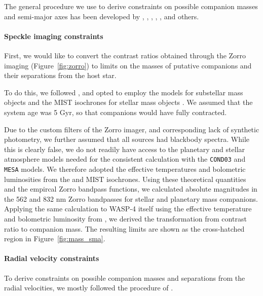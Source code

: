\documentclass[12pt,twocolumn,tighten]{aastex62}
\begin{document}
The general procedure we use to derive constraints on possible
companion masses and semi-major axes has been developed by
\citet{wright_linear_trends_2007}, \citet{crepp_trends_2012},
\citet{montet_trends_2014}, \citet{knutson_friends_2014},
\citet{bryan_statistics_2016,bryan_excess_2019}, and others.

\paragraph{Speckle imaging constraints}

First, we would like to convert the contrast ratios obtained through
the Zorro imaging (Figure~\ref{fig:zorro}) to limits on the masses of
putative companions and their separations from the host star.

To do this, we followed \citet{montet_trends_2014}, and opted to
employ the \citet{baraffe_evolutionary_2003} models for substellar
mass objects and the MIST isochrones for stellar mass objects
\citep{paxton_modules_2011,paxton_modules_2013,paxton_modules_2015,dotter_mesa_2016,choi_mesa_2016}.
We assumed that the system age was 5 Gyr, so that companions would
have fully contracted.

Due to the custom filters of the Zorro imager, and corresponding lack
of synthetic photometry, we further assumed that all sources had
blackbody spectra. While this is clearly false, we do not readily have
access to the planetary and stellar atmosphere models needed for the
consistent calculation with the \texttt{COND03} and \texttt{MESA}
models.  We therefore adopted the effective temperatures and
bolometric luminosities from the \citet{baraffe_evolutionary_2003} and
MIST isochrones.  Using these theoretical quantities and the empircal
Zorro bandpass functions, we calculated absolute magnitudes in the 562
and 832 nm Zorro bandpasses for stellar and planetary mass companions.
Applying the same calculation to WASP-4 itself using the effective
temperature and bolometric luminosity from
, we derived the transformation from
contrast ratio to companion mass.  The resulting limits are shown as
the cross-hatched region in Figure~\ref{fig:mass_sma}.


\paragraph{Radial velocity constraints}

To derive constraints on possible companion masses and separations
from the radial velocities, we mostly followed the procedure of
\citet{bryan_excess_2019}. 
\end{document}
